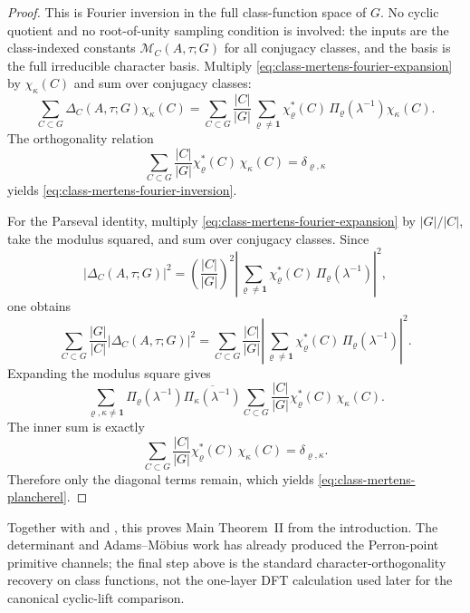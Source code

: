 \documentclass[11pt,a4paper]{amsart}
\theoremstyle{plain}
\theoremstyle{definition}
\theoremstyle{remark}
\begin{document}
\begin{proof}
  This is Fourier inversion in the full class-function space of \(G\).
  No cyclic quotient and no root-of-unity sampling condition is involved:
  the inputs are the class-indexed constants
  \(\mathcal M_C(A,\tau;G)\) for all conjugacy classes, and the basis is
  the full irreducible character basis.
  Multiply \eqref{eq:class-mertens-fourier-expansion} by
  \(\chi_\kappa(C)\) and sum over conjugacy classes:
  \[
    \sum_{C\subset G}\Delta_C(A,\tau;G)\chi_\kappa(C)
    =
    \sum_{C\subset G}\frac{|C|}{|G|}
      \sum_{\varrho\neq\mathbf 1}
        \chi_\varrho^\ast(C)\,
        \Pi_\varrho(\lambda^{-1})\chi_\kappa(C).
  \]
  The orthogonality relation
  \[
    \sum_{C\subset G}\frac{|C|}{|G|}
      \chi_\varrho^\ast(C)\,\chi_\kappa(C)
    =\delta_{\varrho,\kappa}
  \]
  yields \eqref{eq:class-mertens-fourier-inversion}.

  For the Parseval identity, multiply
  \eqref{eq:class-mertens-fourier-expansion} by \(|G|/|C|\), take the
  modulus squared, and sum over conjugacy classes. Since
  \[
    |\Delta_C(A,\tau;G)|^2
    =
    \left(\frac{|C|}{|G|}\right)^2
    \left|\sum_{\varrho\neq\mathbf 1}
      \chi_\varrho^\ast(C)\,
      \Pi_\varrho(\lambda^{-1})\right|^2,
  \]
  one obtains
  \[
    \sum_{C\subset G}\frac{|G|}{|C|}|\Delta_C(A,\tau;G)|^2
    =
    \sum_{C\subset G}\frac{|C|}{|G|}
      \left|\sum_{\varrho\neq\mathbf 1}
        \chi_\varrho^\ast(C)\,
        \Pi_\varrho(\lambda^{-1})\right|^2.
  \]
  Expanding the modulus square gives
  \[
    \sum_{\varrho,\kappa\neq\mathbf 1}
      \Pi_\varrho(\lambda^{-1})
      \overline{\Pi_\kappa(\lambda^{-1})}
      \sum_{C\subset G}\frac{|C|}{|G|}
        \chi_\varrho^\ast(C)\,\chi_\kappa(C).
  \]
  The inner sum is exactly
  \[
    \sum_{C\subset G}\frac{|C|}{|G|}
      \chi_\varrho^\ast(C)\,\chi_\kappa(C)
    =\delta_{\varrho,\kappa}.
  \]
  Therefore only the diagonal terms remain, which
  yields \eqref{eq:class-mertens-plancherel}.
\end{proof}

\noindent
Together with  and
, this proves Main Theorem~II from
the introduction. The determinant and Adams--M\"obius work has already
produced the Perron-point primitive channels; the final step above is
the standard character-orthogonality recovery on class functions, not the
one-layer DFT calculation used later for the canonical cyclic-lift
comparison.
\end{document}
